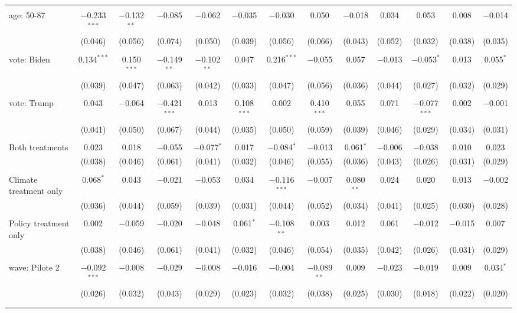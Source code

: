 \begin{tabular}{@{\extracolsep{5pt}}lcccccccccccc}
  & & & & & & & & & & & & \\ 
 age: 50-87 & $-$0.233$^{***}$ & $-$0.132$^{**}$ & $-$0.085 & $-$0.062 & $-$0.035 & $-$0.030 & 0.050 & $-$0.018 & 0.034 & 0.053 & 0.008 & $-$0.014 \\ 
  & (0.046) & (0.056) & (0.074) & (0.050) & (0.039) & (0.056) & (0.066) & (0.043) & (0.052) & (0.032) & (0.038) & (0.035) \\ 
  & & & & & & & & & & & & \\ 
 vote: Biden & 0.134$^{***}$ & 0.150$^{***}$ & $-$0.149$^{**}$ & $-$0.102$^{**}$ & 0.047 & 0.216$^{***}$ & $-$0.055 & 0.057 & $-$0.013 & $-$0.053$^{*}$ & 0.013 & 0.055$^{*}$ \\ 
  & (0.039) & (0.047) & (0.063) & (0.042) & (0.033) & (0.047) & (0.056) & (0.036) & (0.044) & (0.027) & (0.032) & (0.029) \\ 
  & & & & & & & & & & & & \\ 
 vote: Trump & 0.043 & $-$0.064 & $-$0.421$^{***}$ & 0.013 & 0.108$^{***}$ & 0.002 & 0.410$^{***}$ & 0.055 & 0.071 & $-$0.077$^{***}$ & 0.002 & $-$0.001 \\ 
  & (0.041) & (0.050) & (0.067) & (0.044) & (0.035) & (0.050) & (0.059) & (0.039) & (0.046) & (0.029) & (0.034) & (0.031) \\ 
  & & & & & & & & & & & & \\ 
 Both treatments & 0.023 & 0.018 & $-$0.055 & $-$0.077$^{*}$ & 0.017 & $-$0.084$^{*}$ & $-$0.013 & 0.061$^{*}$ & $-$0.006 & $-$0.038 & 0.010 & 0.023 \\ 
  & (0.038) & (0.046) & (0.061) & (0.041) & (0.032) & (0.046) & (0.055) & (0.036) & (0.043) & (0.026) & (0.031) & (0.029) \\ 
  & & & & & & & & & & & & \\ 
 Climate treatment only & 0.068$^{*}$ & 0.043 & $-$0.021 & $-$0.053 & 0.034 & $-$0.116$^{***}$ & $-$0.007 & 0.080$^{**}$ & 0.024 & 0.020 & 0.013 & $-$0.002 \\ 
  & (0.036) & (0.044) & (0.059) & (0.039) & (0.031) & (0.044) & (0.052) & (0.034) & (0.041) & (0.025) & (0.030) & (0.028) \\ 
  & & & & & & & & & & & & \\ 
 Policy treatment only & 0.002 & $-$0.059 & $-$0.020 & $-$0.048 & 0.061$^{*}$ & $-$0.108$^{**}$ & 0.003 & 0.012 & 0.061 & $-$0.012 & $-$0.015 & 0.007 \\ 
  & (0.038) & (0.046) & (0.061) & (0.041) & (0.032) & (0.046) & (0.054) & (0.035) & (0.042) & (0.026) & (0.031) & (0.029) \\ 
  & & & & & & & & & & & & \\ 
 wave: Pilote 2 & $-$0.092$^{***}$ & $-$0.008 & $-$0.029 & $-$0.008 & $-$0.016 & $-$0.004 & $-$0.089$^{**}$ & 0.009 & $-$0.023 & $-$0.019 & 0.009 & 0.034$^{*}$ \\ 
  & (0.026) & (0.032) & (0.043) & (0.029) & (0.023) & (0.032) & (0.038) & (0.025) & (0.030) & (0.018) & (0.022) & (0.020) \\ 
  & & & & & & & & & & & & \\ 
\hline \\[-1.8ex] 


\end{tabular}

